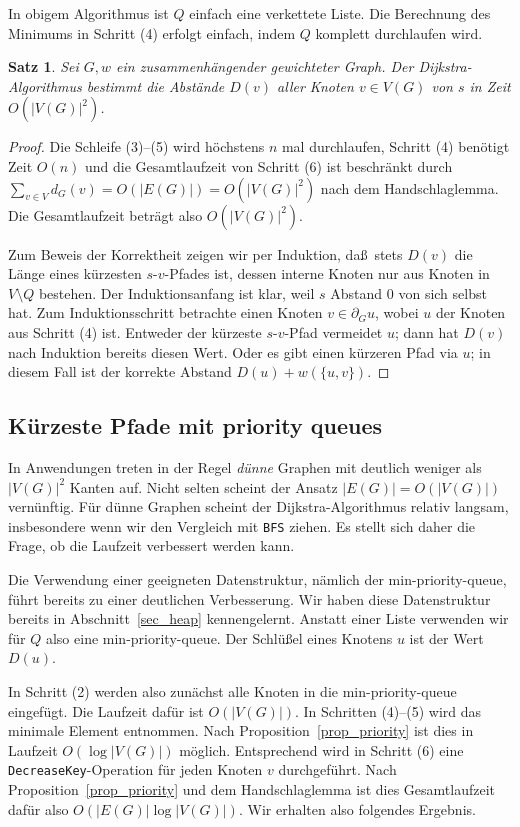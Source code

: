 \documentclass[10pt,reqno]{amsart}
\numberwithin{equation}{section}
\newtheorem{theorem}[definition]{Satz}
\newcommand\Prop{Proposition}
\begin{document}
In obigem Algorithmus ist $Q$ einfach eine verkettete Liste.
Die Berechnung des Minimums in Schritt (4) erfolgt einfach, indem $Q$ komplett durchlaufen wird.

\begin{theorem}
	Sei $G,w$ ein zusammenh\"angender gewichteter Graph.
	Der Dijkstra-Algorithmus bestimmt die Abst\"ande $D(v)$ aller Knoten $v\in V(G)$ von $s$ in Zeit $O(|V(G)|^2)$.
\end{theorem}
\begin{proof}
	Die Schleife (3)--(5) wird h\"ochstens $n$ mal durchlaufen, Schritt (4) ben\"otigt Zeit $O(n)$ und die Gesamtlaufzeit von Schritt (6) ist beschr\"ankt durch $\sum_{v\in V}d_G(v)=O(|E(G)|)=O(|V(G)|^2)$ nach dem Handschlaglemma.
	Die Gesamtlaufzeit betr\"agt also $O(|V(G)|^2)$.

	Zum Beweis der Korrektheit zeigen wir per Induktion, da\ss\ stets $D(v)$ die L\"ange eines k\"urzesten $s$-$v$-Pfades ist, dessen interne Knoten nur aus Knoten in $V\setminus Q$ bestehen.
	Der Induktionsanfang ist klar, weil $s$ Abstand $0$ von sich selbst hat.
	Zum Induktionsschritt betrachte einen Knoten $v\in\partial_G u$, wobei $u$ der Knoten aus Schritt (4) ist.
	Entweder der k\"urzeste $s$-$v$-Pfad vermeidet $u$; dann hat $D(v)$ nach Induktion bereits diesen Wert.
	Oder es gibt einen k\"urzeren Pfad via $u$; in diesem Fall ist der korrekte Abstand $D(u)+w(\{u,v\})$.
\end{proof}

\subsection{K\"urzeste Pfade mit priority queues}\label{sec_dijkstra_priority}
In Anwendungen treten in der Regel {\em d\"unne} Graphen mit deutlich weniger als $|V(G)|^2$ Kanten auf.
Nicht selten scheint der Ansatz $|E(G)|=O(|V(G)|)$ vern\"unftig. 
F\"ur d\"unne Graphen scheint der Dijkstra-Algorithmus relativ langsam, insbesondere wenn wir den Vergleich mit {\tt BFS} ziehen.
Es stellt sich daher die Frage, ob die Laufzeit verbessert werden kann.

Die Verwendung einer geeigneten Datenstruktur, n\"amlich der min-priority-queue, f\"uhrt bereits zu einer deutlichen Verbesserung.
Wir haben diese Datenstruktur bereits in Abschnitt~\ref{sec_heap} kennengelernt.
Anstatt einer Liste verwenden wir f\"ur $Q$ also eine min-priority-queue.
Der Schl\"u\ss el eines Knotens $u$ ist der Wert $D(u)$.

In Schritt (2) werden also zun\"achst alle Knoten in die min-priority-queue eingef\"ugt.
Die Laufzeit daf\"ur ist $O(|V(G)|)$.
In Schritten (4)--(5) wird das minimale Element entnommen. 
Nach \Prop~\ref{prop_priority} ist dies in  Laufzeit $O(\log|V(G)|)$ m\"oglich.
Entsprechend wird in Schritt (6) eine {\tt DecreaseKey}-Operation f\"ur jeden Knoten $v$ durchgef\"uhrt.
Nach \Prop~\ref{prop_priority} und dem Handschlaglemma ist dies Gesamtlaufzeit daf\"ur also $O(|E(G)|\log|V(G)|)$.
Wir erhalten also folgendes Ergebnis.
\end{document}
